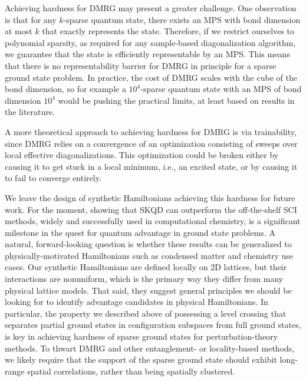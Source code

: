 \documentclass[
  reprint,            %
  amsmath,amssymb,
  aps,
  superscriptaddress, %
  longbibliography
]{revtex4-2}
\theoremstyle{definition}
\begin{document}
Achieving hardness for DMRG may present a greater challenge.
One observation is that for any $k$-sparse quantum state, there exists an MPS with bond dimension at most $k$ that exactly represents the state.
Therefore, if we restrict ourselves to polynomial sparsity, as required for any sample-based diagonalization algorithm, we guarantee that the state is efficiently representable by an MPS.
This means that there is no representability barrier for DMRG in principle for a sparse ground state problem.
In practice, the cost of DMRG scales with the cube of the bond dimension, so for example a $10^4$-sparse quantum state with an MPS of bond dimension $10^4$ would be pushing the practical limits, at least based on results in the literature.

A more theoretical approach to achieving hardness for DMRG is via trainability, since DMRG relies on a convergence of an optimization consisting of sweeps over local effective diagonalizations.
This optimization could be broken either by causing it to get stuck in a local minimum, i.e., an excited state, or by causing it to fail to converge entirely.

We leave the design of synthetic Hamiltonians achieving this hardness for future work.
For the moment, showing that SKQD can outperform the off-the-shelf SCI methods, widely and successfully used in computational chemistry, is a significant milestone in the quest for quantum advantage in ground state problems.
A natural, forward-looking question is whether these results can be generalized to physically-motivated Hamiltonians such as condensed matter and chemistry use cases.
Our synthetic Hamiltonians are defined locally on 2D lattices, but their interactions are nonuniform, which is the primary way they differ from many physical lattice models.
That said, they suggest general principles we should be looking for to identify advantage candidates in physical Hamiltonians.
In particular, the property we described above of possessing a level crossing that separates partial ground states in configuration subspaces from full ground states, is key in achieving hardness of sparse ground states for perturbation-theory methods.
To thwart DMRG and other entanglement- or locality-based methods, we likely require that the support of the sparse ground state should exhibit long-range spatial correlations, rather than being spatially clustered.
\end{document}
